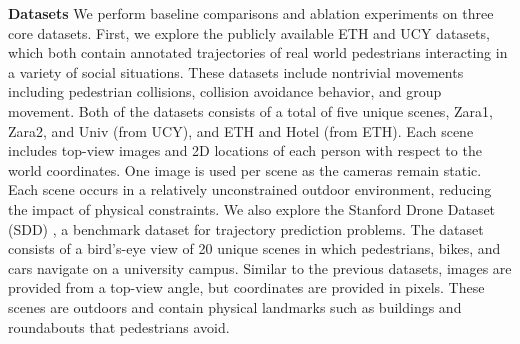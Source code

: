 \documentclass[10pt,twocolumn,letterpaper]{article}
\begin{document}
\begin{table*}[t!]
  \centering
\caption{\small ADE and FDE in pixels of various models on Stanford Drone Dataset. SoPhie's main performance gain comes from the joint introduction of social and physical attention applied in a generative modeling setting.}
  \label{quantitative-table-two}
\end{table*}

\textbf{Datasets} We perform baseline comparisons and ablation experiments on three core datasets. First, we explore the publicly available ETH \cite{pellegrini2010improving} and UCY \cite{lerner2007crowds} datasets, which both contain annotated trajectories of real world pedestrians interacting in a variety of social situations. These datasets include nontrivial movements including pedestrian collisions, collision avoidance behavior, and group movement. Both of the datasets consists of a total of five unique scenes, Zara1, Zara2, and Univ (from UCY), and ETH and Hotel (from ETH). Each scene includes top-view images and 2D locations of each person with respect to the world coordinates. One image is used per scene as the cameras remain static. Each scene occurs in a relatively unconstrained outdoor environment, reducing the impact of physical constraints. We also explore the Stanford Drone Dataset (SDD) \cite{robicquet2016learning}, a benchmark dataset for trajectory prediction problems. The dataset consists of a bird's-eye view of 20 unique scenes in which pedestrians, bikes, and cars navigate on a university campus. Similar to the previous datasets, images are provided from a top-view angle, but coordinates are provided in pixels. These scenes are outdoors and contain physical landmarks such as buildings and roundabouts that pedestrians avoid.
\end{document}
